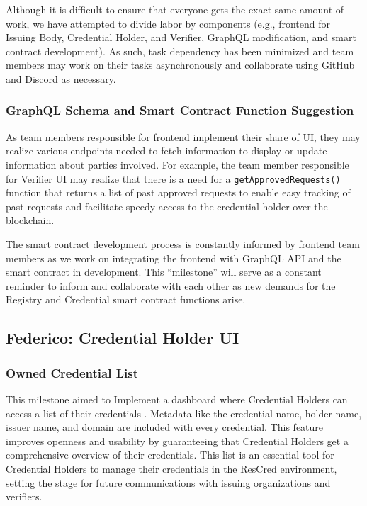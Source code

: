 Although it is difficult to ensure that everyone gets the exact same amount of work, we have attempted to divide labor by components (e.g., frontend for Issuing Body, Credential Holder, and Verifier, GraphQL modification, and smart contract development). As such, task dependency has been minimized and team members may work on their tasks asynchronously and collaborate using GitHub and Discord as necessary.

\subsubsection{GraphQL Schema and Smart Contract Function Suggestion}

As team members responsible for frontend implement their share of UI, they may realize various
endpoints needed to fetch information to display or update information about parties involved. For
example, the team member responsible for Verifier UI may realize that there is a need for a
\verb|getApprovedRequests()| function that returns a list of past approved requests to enable easy tracking of past requests and facilitate speedy access to the credential holder over the blockchain.

The smart contract development process is constantly informed by frontend team members as we work on integrating the frontend with GraphQL API and the smart contract in development. This “milestone” will serve as a constant reminder to inform and collaborate with each other as new demands for the Registry and Credential smart contract functions arise.

\subsection{Federico: Credential Holder UI}

\subsubsection{Owned Credential List}

This milestone aimed to Implement a dashboard where Credential Holders can access a list of their credentials . Metadata like the credential name, holder name, issuer name, and domain are included with every credential. This feature improves openness and usability by guaranteeing that Credential Holders get a comprehensive overview of their credentials. This list is an essential tool for Credential Holders to manage their credentials in the ResCred environment, setting the stage for future communications with issuing organizations and verifiers.

